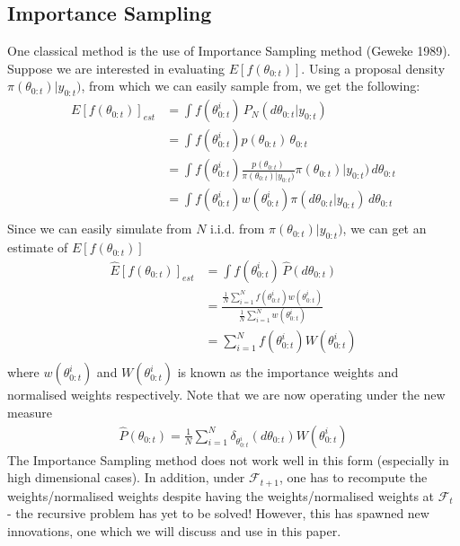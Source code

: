 \documentclass[11pt]{article}
\theoremstyle{definition}
\begin{document}
\subsection{Importance Sampling}
One classical method is the use of Importance Sampling method (Geweke 1989). Suppose we are interested in evaluating $E[f(\theta_{0:t})]$. Using a proposal density $\pi(\theta_{0:t})|y_{0:t})$, from which we can easily sample from, we get the following:
\begin{equation}
	\begin{aligned}
		E[f(\theta_{0:t})]_{est} &= \int f(\theta_{0:t}^{i}) \,P_{N}(d\theta_{0:t}|y_{0:t}) \\
		&= \int f(\theta_{0:t}^{i})p(\theta_{0:t}) \,\theta_{0:t} \\
		&= \int f(\theta_{0:t}^{i})\frac{p(\theta_{0:t})}{\pi(\theta_{0:t})|y_{0:t})}\pi(\theta_{0:t})|y_{0:t})\,d\theta_{0:t} \\
		&= \int f(\theta_{0:t}^{i})w(\theta_{0:t}^{i})\pi(d\theta_{0:t}|y_{0:t})\,d\theta_{0:t} \\
	\end{aligned}
\end{equation}
Since we can easily simulate from $N$ i.i.d. from $\pi(\theta_{0:t})|y_{0:t})$, we can get an estimate of $E[f(\theta_{0:t})]$
\begin{equation}
	\begin{aligned}
		\hat{E}[f(\theta_{0:t})]_{est} &= \int f(\theta_{0:t}^{i})\,\hat{P}(d\theta_{0:t}) \\
		&=\frac{\frac{1}{N}\sum_{i=1}^{N}f(\theta_{0:t}^{i})w(\theta_{0:t}^{i})}{\frac{1}{N}\sum_{i=1}^{N}w(\theta_{0:t}^{i})} \\
		&= \sum_{i=1}^{N}f(\theta_{0:t}^{i})W(\theta_{0:t}^{i}) \\
	\end{aligned}
\end{equation}
where $w(\theta_{0:t}^{i})$ and $W(\theta_{0:t}^{i})$ is known as the importance weights and normalised weights respectively. Note that we are now operating under the new measure 
\begin{equation}
	\begin{aligned}
		\hat{P}(\theta_{0:t}) = \frac{1}{N}\sum_{i=1}^{N}\delta_{\theta_{0:t}^{i}}(d\theta_{0:t})W(\theta_{0:t}^{i})
	\end{aligned}
\end{equation}
The Importance Sampling method does not work well in this form (especially in high dimensional cases). In addition, under $\mathcal{F}_{t+1}$, one has to recompute the weights/normalised weights despite having the weights/normalised weights at $\mathcal{F}_{t}$ - the recursive problem has yet to be solved! However, this has spawned new innovations, one which we will discuss and use in this paper.
\end{document}
